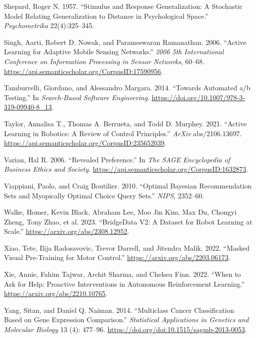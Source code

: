 \documentclass[
  letterpaper,
  numbers=noenddot,
  DIV=11]{scrreprt}
\newlength{\cslhangindent}
\newenvironment{CSLReferences}[2] %
 {\begin{list}{}{%
  \setlength{\itemindent}{0pt}
  \setlength{\leftmargin}{0pt}
  \setlength{\parsep}{0pt}
  \ifodd #1
   \setlength{\leftmargin}{\cslhangindent}
   \setlength{\itemindent}{-1\cslhangindent}
  \fi
  \setlength{\itemsep}{#2\baselineskip}}}
 {\end{list}}
\theoremstyle{definition}
\theoremstyle{plain}
\theoremstyle{plain}
\theoremstyle{remark}
\begin{document}
\begin{CSLReferences}{1}{0}
Shepard, Roger N. 1957. {``Stimulus and Response Generalization: A
Stochastic Model Relating Generalization to Distance in Psychological
Space.''} \emph{Psychometrika} 22(4):325--345.

Singh, Aarti, Robert D. Nowak, and Parameswaran Ramanathan. 2006.
{``Active Learning for Adaptive Mobile Sensing Networks.''} \emph{2006
5th International Conference on Information Processing in Sensor
Networks}, 60--68.
\url{https://api.semanticscholar.org/CorpusID:17590956}.

Tamburrelli, Giordano, and Alessandro Margara. 2014. {``Towards
Automated a/b Testing.''} In \emph{Search-Based Software Engineering}.
\url{https://doi.org/10.1007/978-3-319-09940-8_13}.

Taylor, Annalisa T., Thomas A. Berrueta, and Todd D. Murphey. 2021.
{``Active Learning in Robotics: A Review of Control Principles.''}
\emph{ArXiv} abs/2106.13697.
\url{https://api.semanticscholar.org/CorpusID:235652039}.

Varian, Hal R. 2006. {``Revealed Preference.''} In \emph{The SAGE
Encyclopedia of Business Ethics and Society}.
\url{https://api.semanticscholar.org/CorpusID:1632873}.

Viappiani, Paolo, and Craig Boutilier. 2010. {``Optimal Bayesian
Recommendation Sets and Myopically Optimal Choice Query Sets.''}
\emph{NIPS}, 2352--60.

Walke, Homer, Kevin Black, Abraham Lee, Moo Jin Kim, Max Du, Chongyi
Zheng, Tony Zhao, et al. 2023. {``BridgeData V2: A Dataset for Robot
Learning at Scale.''} \url{https://arxiv.org/abs/2308.12952}.

Xiao, Tete, Ilija Radosavovic, Trevor Darrell, and Jitendra Malik. 2022.
{``Masked Visual Pre-Training for Motor Control.''}
\url{https://arxiv.org/abs/2203.06173}.

Xie, Annie, Fahim Tajwar, Archit Sharma, and Chelsea Finn. 2022. {``When
to Ask for Help: Proactive Interventions in Autonomous Reinforcement
Learning.''} \url{https://arxiv.org/abs/2210.10765}.

Yang, Sitan, and Daniel Q. Naiman. 2014. {``Multiclass Cancer
Classification Based on Gene Expression Comparison.''} \emph{Statistical
Applications in Genetics and Molecular Biology} 13 (4): 477--96.
\url{https://doi.org/doi:10.1515/sagmb-2013-0053}.


\end{CSLReferences}
\end{document}
